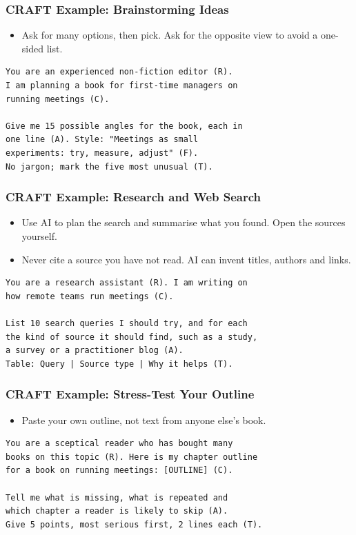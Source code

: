 \begin{frame}[fragile]\frametitle{CRAFT Example: Brainstorming Ideas}
\begin{itemize}
\item Ask for many options, then pick. Ask for the opposite view to avoid a one-sided list.
\end{itemize}
\begin{lstlisting}[language=HTML]
You are an experienced non-fiction editor (R).
I am planning a book for first-time managers on
running meetings (C).

Give me 15 possible angles for the book, each in
one line (A). Style: "Meetings as small
experiments: try, measure, adjust" (F).
No jargon; mark the five most unusual (T).
\end{lstlisting}
\end{frame}

\begin{frame}[fragile]\frametitle{CRAFT Example: Research and Web Search}
\begin{itemize}
\item Use AI to plan the search and summarise what you found. Open the sources yourself.
\item Never cite a source you have not read. AI can invent titles, authors and links.
\end{itemize}
\begin{lstlisting}[language=HTML]
You are a research assistant (R). I am writing on
how remote teams run meetings (C).

List 10 search queries I should try, and for each
the kind of source it should find, such as a study,
a survey or a practitioner blog (A).
Table: Query | Source type | Why it helps (T).
\end{lstlisting}
\end{frame}

\begin{frame}[fragile]\frametitle{CRAFT Example: Stress-Test Your Outline}
\begin{itemize}
\item Paste your own outline, not text from anyone else's book.
\end{itemize}
\begin{lstlisting}[language=HTML]
You are a sceptical reader who has bought many
books on this topic (R). Here is my chapter outline
for a book on running meetings: [OUTLINE] (C).

Tell me what is missing, what is repeated and
which chapter a reader is likely to skip (A).
Give 5 points, most serious first, 2 lines each (T).
\end{lstlisting}
\end{frame}

